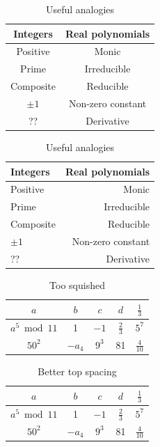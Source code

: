 \documentclass[12pt,letterpaper]{amsart}
\newcommand{\tfix}{\rule{0pt}{2.6ex}}
\theoremstyle{plain}
\theoremstyle{definition}
\numberwithin{equation}{section}
\begin{document}
\begin{table}[ht]
\begin{center}
\begin{tabular}{c|c} 
Integers & Real polynomials \\ \hline
Positive & Monic \\
Prime & Irreducible \\
Composite & Reducible \\
$\pm 1$ & Non-zero constant \\ 
?? & Derivative \\
\end{tabular}
\caption{Useful analogies}\label{tab1}
\end{center}
\end{table}

\begin{table}[ht]
\begin{center}
\begin{tabular}{|l||r|} \hline 
Integers & Real polynomials \\ \hline
Positive & Monic \\
Prime & Irreducible \\
Composite & Reducible \\
$\pm 1$ & Non-zero constant \\ 
?? & Derivative \\ \hline
\end{tabular}
\caption{Useful analogies}\label{tab2}
\end{center}
\end{table}


\begin{table}[ht]
\begin{center}
\begin{tabular}{c||c|c|c|c}  \hline 
$a$ & $b$ & $c$ & $d$ & $\frac{1}{3}$ \\ \hline
$a^{5} \bmod 11$ & 1& $-1$ & $\frac{2}{3}$ & $5^7$    \\ \hline 
$50^2$ & $-a_4$ & $9^3$ & 81 & $\frac{4}{10}$  \\ \hline
\end{tabular}
\caption{Too squished }\label{tootop}
\end{center}
\end{table}


\begin{table}[ht]
\begin{center}
\begin{tabular}{c||c|c|c|c} \hline
\tfix $a$  & $b$ & $c$ & $d$ & $\frac{1}{3}$ \\ \hline
\tfix $a^{5} \bmod 11$ & 1& $-1$ & $\frac{2}{3}$ & $5^7$    \\ \hline 
\tfix $50^2$ & $-a_4$ & $9^3$ & 81 & $\frac{4}{10}$ \\ \hline
\end{tabular} \\
\caption{Better top spacing}\label{tootop2}
\end{center}
\end{table}
\end{document}
